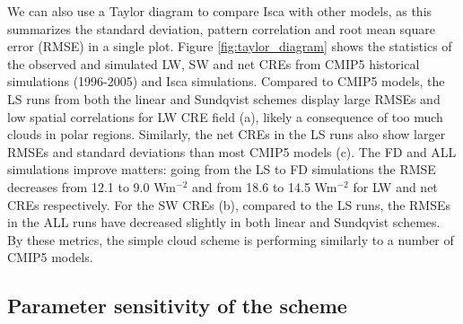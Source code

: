 We can also use a Taylor diagram \citep{Taylor2001} to compare Isca with other models, as this summarizes the standard deviation, pattern correlation and root mean square error (RMSE) in a single plot. Figure \ref{fig:taylor_diagram} shows the statistics of the observed and simulated LW, SW and net CREs from CMIP5 historical simulations (1996-2005) and Isca simulations. Compared to CMIP5 models, the LS runs from both the linear and Sundqvist schemes display large RMSEs and low spatial correlations for LW CRE field (a), likely a consequence of too much clouds in polar regions. Similarly, the net CREs in the LS runs also show larger RMSEs and standard deviations than most CMIP5 models (c). The FD and ALL simulations improve matters: going from the LS to FD simulations the RMSE decreases from 12.1 to 9.0 Wm$^{-2}$ and from 18.6 to 14.5 Wm$^{-2}$ for LW and net CREs respectively. For the SW CREs (b), compared to the LS runs, the RMSEs in the ALL runs have decreased slightly in both linear and Sundqvist schemes. By these metrics, the  simple cloud scheme  is performing similarly to a number of CMIP5 models.

\subsection{Parameter sensitivity of the scheme}
\label{sec:sensitivity}

